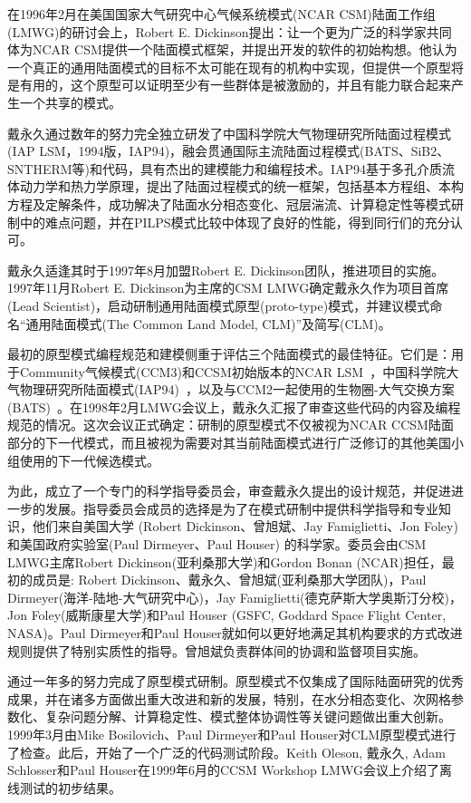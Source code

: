 在1996年2月在美国国家大气研究中心气候系统模式(NCAR CSM)陆面工作组(LMWG)的研讨会上，Robert E. Dickinson提出：让一个更为广泛的科学家共同体为NCAR CSM提供一个陆面模式框架，并提出开发的软件的初始构想。他认为一个真正的通用陆面模式的目标不太可能在现有的机构中实现，但提供一个原型将是有用的，这个原型可以证明至少有一些群体是被激励的，并且有能力联合起来产生一个共享的模式。

戴永久通过数年的努力完全独立研发了中国科学院大气物理研究所陆面过程模式(IAP LSM，1994版，IAP94)，融会贯通国际主流陆面过程模式(BATS、SiB2、SNTHERM等)和代码，具有杰出的建模能力和编程技术。IAP94基于多孔介质流体动力学和热力学原理，提出了陆面过程模式的统一框架，包括基本方程组、本构方程及定解条件，成功解决了陆面水分相态变化、冠层湍流、计算稳定性等模式研制中的难点问题，并在PILPS模式比较中体现了良好的性能，得到同行们的充分认可。

戴永久适逢其时于1997年8月加盟Robert E. Dickinson团队，推进项目的实施。1997年11月Robert E. Dickinson为主席的CSM LMWG确定戴永久作为项目首席(Lead Scientist)，启动研制通用陆面模式原型(proto-type)模式，并建议模式命名“通用陆面模式(The Common Land Model, CLM)”及简写(CLM)。

最初的原型模式编程规范和建模侧重于评估三个陆面模式的最佳特征。它们是：用于Community气候模式(CCM3)和CCSM初始版本的NCAR LSM~\citep{bonan1996land}，中国科学院大气物理研究所陆面模式(IAP94)~\citep{Dai-Zeng_97_IAP94}，以及与CCM2一起使用的生物圈-大气交换方案(BATS)~\citep{dickinson1993biosphere}。在1998年2月LMWG会议上，戴永久汇报了审查这些代码的内容及编程规范的情况。这次会议正式确定：研制的原型模式不仅被视为NCAR CCSM陆面部分的下一代模式，而且被视为需要对其当前陆面模式进行广泛修订的其他美国小组使用的下一代候选模式。

为此，成立了一个专门的科学指导委员会，审查戴永久提出的设计规范，并促进进一步的发展。指导委员会成员的选择是为了在模式研制中提供科学指导和专业知识，他们来自美国大学 (Robert Dickinson、曾旭斌、Jay Famiglietti、Jon Foley)和美国政府实验室(Paul Dirmeyer、Paul Houser) 的科学家。委员会由CSM LMWG主席Robert Dickinson(亚利桑那大学)和Gordon Bonan (NCAR)担任，最初的成员是: Robert Dickinson、戴永久、曾旭斌(亚利桑那大学团队)，Paul Dirmeyer(海洋-陆地-大气研究中心)，Jay Famiglietti(德克萨斯大学奥斯汀分校)，Jon Foley(威斯康星大学)和Paul Houser (GSFC, Goddard Space Flight Center, NASA)。Paul Dirmeyer和Paul Houser就如何以更好地满足其机构要求的方式改进规则提供了特别实质性的指导。曾旭斌负责群体间的协调和监督项目实施。

通过一年多的努力完成了原型模式研制。原型模式不仅集成了国际陆面研究的优秀成果，并在诸多方面做出重大改进和新的发展，特别，在水分相态变化、次网格参数化、复杂问题分解、计算稳定性、模式整体协调性等关键问题做出重大创新。1999年3月由Mike Bosilovich、Paul Dirmeyer和Paul Houser对CLM原型模式进行了检查。此后，开始了一个广泛的代码测试阶段。Keith Oleson, 戴永久, Adam Schlosser和Paul Houser在1999年6月的CCSM Workshop LMWG会议上介绍了离线测试的初步结果。

